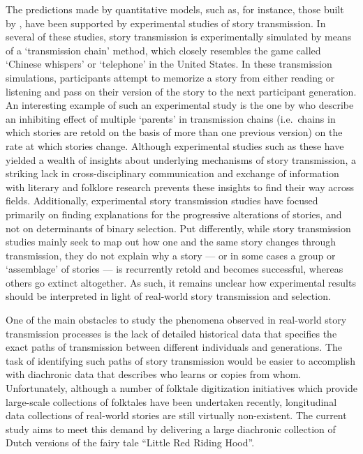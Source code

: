 The predictions made by quantitative models, such as, for instance, those built by \citeauthor{sforzafeldman:1981}\autocite{sforzafeldman:1981}, have been supported by experimental studies of story transmission. In several of these studies, story transmission is experimentally simulated by means of a `transmission chain' method, which closely resembles the game called `Chinese whispers' or `telephone' in the United States.\autocite{bartlett,mesoudiwhiten:2008} In these transmission simulations, participants attempt to memorize a story from either reading or listening and pass on their version of the story to the next participant generation. An interesting example of such an experimental study is the one by \citeauthor{eriksson:2012} who describe an inhibiting effect of multiple `parents' in transmission chains (i.e.\ chains in which stories are retold on the basis of more than one previous version) on the rate at which stories change.\autocite{eriksson:2012} Although experimental studies such as these have yielded a wealth of insights about underlying mechanisms of story transmission, a striking lack in cross-disciplinary communication and exchange of information with literary and folklore research prevents these insights to find their way across fields. Additionally, experimental story transmission studies have focused primarily on finding explanations for the progressive alterations of stories, and not on determinants of binary selection\autocite[Notable exceptions include, e.g.][]{Heath:2001,eriksson:2014}. Put differently, while story transmission studies mainly seek to map out how one and the same story changes through transmission, they do not explain why a story — or in some cases a group or `assemblage' of stories — is recurrently retold and becomes successful, whereas others go extinct altogether.\autocite{zipes:2006,zipes:2012} As such, it remains unclear how experimental results should be interpreted in light of real-world story transmission and selection.

One of the main obstacles to study the phenomena observed in real-world story transmission processes is the lack of detailed historical data that specifies the exact paths of transmission between different individuals and generations. The task of identifying such paths of story transmission would be easier to accomplish with diachronic data that describes who learns or copies from whom\autocite{kandler:2015}. Unfortunately, although a number of folktale digitization initiatives which provide large-scale collections of folktales have been undertaken recently\autocite{abello:2012,barre:2012,meder:2010,meder:2016}, longitudinal data collections of real-world stories are still virtually non-existent. The current study aims to meet this demand by delivering a large diachronic collection of Dutch versions of the fairy tale ``Little Red Riding Hood''.

